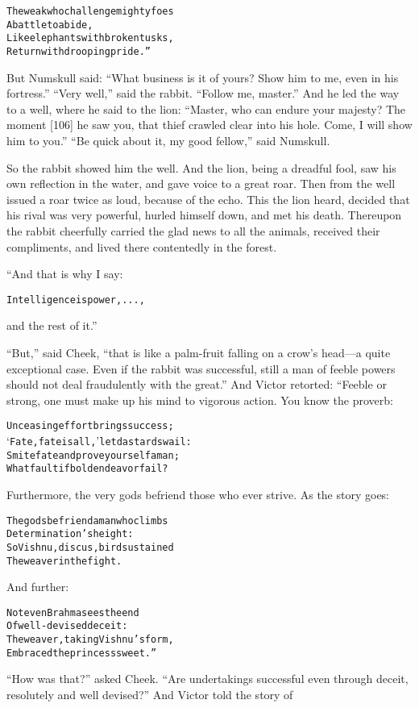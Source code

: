 \documentclass{article}
\renewenvironment{verbatim}{\begin{alltt}\normalfont\begin{centering}}{\end{centering}\end{alltt}}
\begin{document}
\begin{verbatim}
The weak who challenge mighty foes
    A battle to abide,
Like elephants with broken tusks,
    Return with drooping pride.”
\end{verbatim}
But Numskull said:
``What business is it of yours? Show him to me, even in his fortress.''
``Very well,'' said the rabbit. ``Follow me, master.'' And he led
the way to a well, where he said to the lion:
``Master, who can endure your majesty? The moment [106] he saw you, that thief crawled clear into his hole. Come, I will show him to you.''
``Be quick about it, my good fellow,'' said Numskull.

So the rabbit showed him the well. And the lion, being a dreadful
fool, saw his own reflection in the water, and gave voice to a
great roar. Then from the well issued a roar twice as loud, because
of the echo. This the lion heard, decided that his rival was very
powerful, hurled himself down, and met his death. Thereupon the
rabbit cheerfully carried the glad news to all the animals,
received their compliments, and lived there contentedly in the
forest.

“And that is why I say:

\begin{verbatim}
Intelligence is power, . ..,
\end{verbatim}
and the rest of it.”

``But,'' said Cheek,
``that is like a palm-fruit falling on a crow's head---a quite exceptional case. Even if the rabbit was successful, still a man of feeble powers should not deal fraudulently with the great.''
And Victor retorted: “Feeble or strong, one must make up his mind
to vigorous action. You know the proverb:

\begin{verbatim}
Unceasing effort brings success;
    ‘Fate, fate is all,’ let dastards wail:
Smite fate and prove yourself a man;
    What fault if bold endeavor fail?
\end{verbatim}
Furthermore, the very gods befriend those who ever strive. As the
story goes:

\begin{verbatim}
The gods befriend a man who climbs
    Determination's height:
So Vishnu, discus, bird sustained
    The weaver in the fight.
\end{verbatim}
And further:

\begin{verbatim}
Not even Brahma sees the end
    Of well-devised deceit:
The weaver, taking Vishnu's form,
    Embraced the princess sweet.”
\end{verbatim}
``How was that?'' asked Cheek.
``Are undertakings successful even through deceit, resolutely and well devised?''
And Victor told the story of
\end{document}
